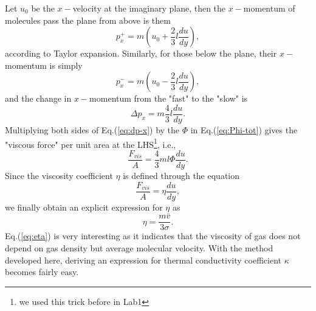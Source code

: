 Let $ u_0 $ be the $ x- $velocity at the imaginary plane, then the $ x- $momentum of molecules pass the plane from above is them
\begin{equation}
	p_x^{+}=m(u_0+\frac{2}{3}l\frac{du}{dy}),
	\label{eq:px+}
\end{equation}
according to Taylor expansion. Similarly, for those below the plane, their $ x- $momentum is simply
\begin{equation}
	p_x^{-}=m(u_0-\frac{2}{3}l\frac{du}{dy}),
	\label{eq:px-}
\end{equation}
and the change in $ x- $momentum from the "fast" to the "slow" is 
\begin{equation}
	\Delta p_x = m\frac{4}{3}l\frac{du}{dy}.\label{eq:dp-x}
\end{equation}
Multiplying both sides of Eq.(\ref{eq:dp-x}) by the $\Phi$ in Eq.(\ref{eq:Phi-tot}) gives the "viscous force" per unit area at the LHS\footnote{we used this trick before in Lab1}, i.e.,
\begin{equation}
	\frac{F_{vis}}{A} = \frac{4}{3}ml\Phi\frac{du}{dy}.
\end{equation}
Since the viscosity coefficient $ \eta $ is defined through the equation 
\begin{equation}
	\frac{F_{vis}}{A} = \eta\frac{du}{dy},
	\label{eq:viscosity}
\end{equation}
we finally obtain an explicit expression for $ \eta $ as
\begin{equation}
	\eta = \frac{m\bar{v}}{3\sigma}.
	\label{eq:eta}
\end{equation}
Eq.(\ref{eq:eta}) is very interesting as it indicates that the viscosity of gas does not depend on gas density but average molecular velocity. With the method developed here, deriving an expression for thermal conductivity coefficient $ \kappa $ becomes fairly easy.

